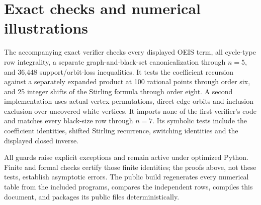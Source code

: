 \documentclass[11pt]{article}
\theoremstyle{remark}\newtheorem{remark}[theorem]{Remark}
\begin{document}
\section{Exact checks and numerical illustrations}\label{mis:sec:numeric}
The accompanying exact verifier checks every displayed OEIS term, all cycle-type row integrality, a separate graph-and-black-set canonicalization through $n=5$, and 36,448 support/orbit-loss inequalities. It tests the coefficient recursion against a separately expanded product at 100 rational points through order six, and 25 integer shifts of the Stirling formula through order eight. A second implementation uses actual vertex permutations, direct edge orbits and inclusion--exclusion over uncovered white vertices. It imports none of the first verifier's code and matches every black-size row through $n=7$. Its symbolic tests include the coefficient identities, shifted Stirling recurrence, switching identities and the displayed closed inverse.

All guards raise explicit exceptions and remain active under optimized Python. Finite and formal checks certify those finite identities; the proofs above, not these tests, establish asymptotic errors. The public build regenerates every numerical table from the included programs, compares the independent rows, compiles this document, and packages its public files deterministically.
\end{document}
